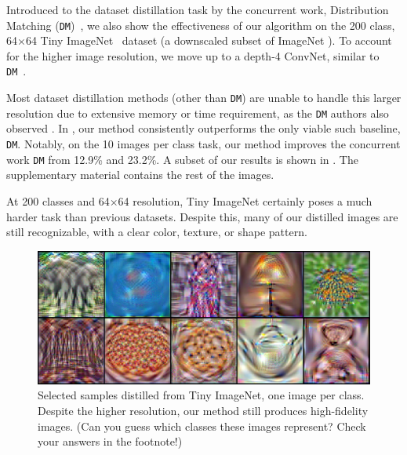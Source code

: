 Introduced to the dataset distillation task by the concurrent work, Distribution Matching (\texttt{DM})~\cite{dm}, we also show the effectiveness of our algorithm on the 200 class, 64$\times$64 Tiny ImageNet~\cite{tiny} dataset (a downscaled subset of ImageNet \cite{deng2009imagenet}). %
To account for the higher image resolution, we move up to a depth-4 ConvNet, similar to \texttt{DM}~\cite{dm}.

Most dataset distillation methods (other than \texttt{DM}) are unable to handle this larger resolution due to extensive memory or time requirement, as the \texttt{DM} authors also observed \citep{dm}. In , our method consistently outperforms the only viable such baseline, \texttt{DM}. Notably, on the 10 images per class task, our method improves the concurrent work \texttt{DM} from  12.9\% and 23.2\%. A subset of our results is shown in . The supplementary material contains the rest of the images. %


At 200 classes and 64$\times$64 resolution, Tiny ImageNet certainly poses a much harder task than previous datasets. Despite this, many of our distilled images are still recognizable, with a clear color, texture, or shape pattern.
\begin{figure}[t]
    \centering
    \includegraphics[width=\linewidth]{figures/Tiny.pdf}
         \vspace{-7pt}
    \caption{Selected samples distilled from Tiny ImageNet, one image per class. Despite the higher resolution, our method still produces high-fidelity images. (Can you guess which classes these images represent? Check your answers in the footnote!\protect\footnotemark)}
    \vspace{-7pt}
\end{figure}

